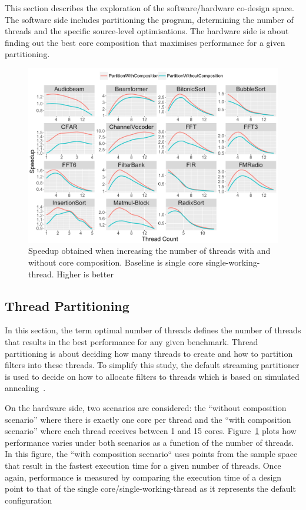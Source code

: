 This section describes the exploration of the software/hardware co-design space.
The software side includes partitioning the program, determining the number of threads and the specific source-level optimisations.
The hardware side is about finding out the best core composition that maximises performance for a given partitioning.

\begin{figure}[t]
 \centering
    \includegraphics[width=1\textwidth]{streamit-paper/graphics/threadingmaybe5.pdf}
    \caption{Speedup obtained when increasing the number of threads with and without core composition. Baseline is single core single-working-thread. Higher is better}\label{fig:threadtrend}  \vspace{-1em}

\end{figure}

\subsection{Thread Partitioning}

In this section, the term optimal number of threads defines the number of threads that results in the best performance for any given benchmark.
Thread partitioning is about deciding how many threads to create and how to partition filters into these threads.
To simplify this study, the default streaming partitioner is used to decide on how to allocate filters to threads which is based on simulated annealing~\cite{simulatedAnnealing1983}.

On the hardware side, two scenarios are considered: the ``without composition scenario'' where there is exactly one core per thread and the ``with composition scenario'' where each thread receives between 1 and 15 cores.
Figure~\ref{fig:threadtrend} plots how performance varies under both scenarios as a function of the number of threads.
In this figure, the ``with composition scenario`` uses points from the sample space that result in the fastest execution time for a given number of threads.
Once again, performance is measured by comparing the execution time of a design point to that of the single core/single-working-thread as it represents the default configuration

